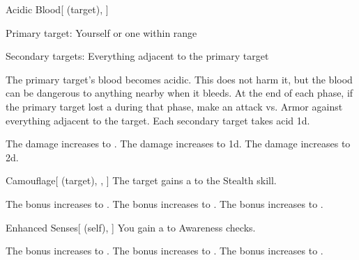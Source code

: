 \lowercase{\hypertarget{spell:Acidic Blood}{}}\label{spell:Acidic Blood}
\begin{attuneability}[Rank 1]{\hypertarget{spell:Acidic Blood}{Acidic Blood}}[ (target), ]

Primary target: Yourself or one  within \rngclose range
\par\noindent
Secondary targets: Everything adjacent to the primary target

The primary target's blood becomes acidic.
This does not harm it, but the blood can be dangerous to anything nearby when it bleeds.
At the end of each phase, if the primary target lost a  during that phase, make an attack vs. Armor against everything adjacent to the target.
\hit Each secondary target takes acid  \minus1d.

\rankline
{} The damage increases to .
 The damage increases to  \plus1d.
 The damage increases to  \plus2d.
\end{attuneability}
\vspace{0.25em}



\lowercase{\hypertarget{spell:Camouflage}{}}\label{spell:Camouflage}
\begin{attuneability}[Rank 1]{\hypertarget{spell:Camouflage}{Camouflage}}[ (target), , ]
The target gains a   to the Stealth skill.

\rankline
{} The bonus increases to .
 The bonus increases to .
 The bonus increases to .
\end{attuneability}
\vspace{0.25em}



\lowercase{\hypertarget{spell:Enhanced Senses}{}}\label{spell:Enhanced Senses}
\begin{attuneability}[Rank 1]{\hypertarget{spell:Enhanced Senses}{Enhanced Senses}}[ (self), ]
You gain a   to Awareness checks.

\rankline
{} The bonus increases to .
 The bonus increases to .
 The bonus increases to .
\end{attuneability}
\vspace{0.25em}



